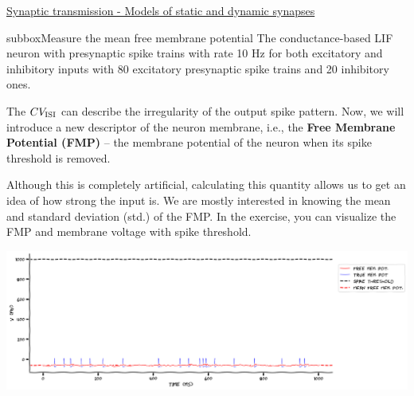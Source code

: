 \begin{textbox}{\href{https://compneuro.neuromatch.io/tutorials/W2D3_BiologicalNeuronModels/student/W2D3_Tutorial3.html}{Synaptic transmission - Models of static and dynamic synapses } }
\begin{subbox}{subbox}{Measure the mean free membrane potential}
\scriptsize
The conductance-based LIF neuron with presynaptic spike trains with rate 10 Hz for both excitatory and inhibitory inputs with 80 excitatory presynaptic spike trains and 20 inhibitory ones.

The $CV_{\rm ISI}$ can describe the irregularity of the output spike pattern. Now, we will introduce a new descriptor of the neuron membrane, i.e., the  \textbf{Free Membrane Potential (FMP)} -- the membrane potential of the neuron when its spike threshold is removed. 

Although this is completely artificial, calculating this quantity allows us to get an idea of how strong the input is. We are mostly interested in knowing the mean and standard deviation (std.) of the FMP. In the exercise, you can visualize the FMP and membrane voltage with spike threshold.
\begin{center}
    
\includegraphics[scale=0.14]{Figures/BNM/LIF_Figure9.png}
\end{center}

\end{subbox}

\end{textbox}

